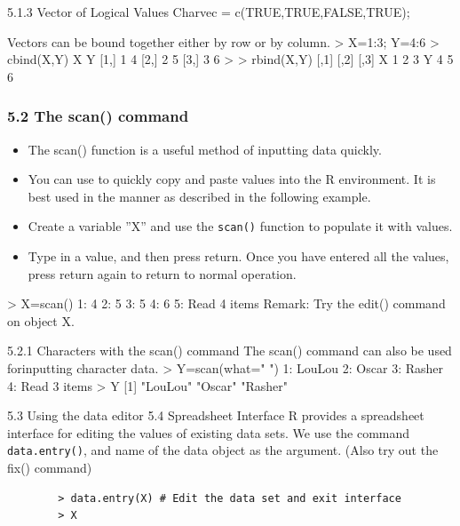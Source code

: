 \documentclass{beamer}
\begin{document}
\begin{frame}
	5.1.3 Vector of Logical Values
	Charvec = c(TRUE,TRUE,FALSE,TRUE);
	
	Vectors can be bound together either by row or by column.
	> X=1:3; Y=4:6
	> cbind(X,Y)
	X Y
	[1,] 1 4
	[2,] 2 5
	[3,] 3 6
	>
	> rbind(X,Y)
	[,1] [,2] [,3]
	X 1 2 3
	Y 4 5 6
\end{frame}
\begin{frame}
\frametitle{5.2 The scan() command}
\begin{itemize}
\item	The scan() function is a useful method of inputting data quickly. 
\item You can use to quickly copy
	and paste values into the R environment. It is best used in the manner as described in the
	following example. 
\item Create a variable ”X” and use the \texttt{scan()} function to populate it with
	values. 
\item Type in a value, and then press return. Once you have entered all the values, press
	return again to return to normal operation.
\end{itemize}
\end{frame}
\begin{frame}[fragile]
	> X=scan()
	1: 4
	2: 5
	3: 5
	4: 6
	5:
	Read 4 items
	Remark: Try the edit() command on object X.
\end{frame}
\begin{frame}[fragile]
	5.2.1 Characters with the scan() command
	The scan() command can also be used forinputting character data.
	> Y=scan(what=" ")
	1: LouLou
	2: Oscar
	3: Rasher
	4:
	Read 3 items
	> Y
	[1] "LouLou" "Oscar" "Rasher"
\end{frame}
\begin{frame}[fragile]
	5.3 Using the data editor
	5.4 Spreadsheet Interface
	R provides a spreadsheet interface for editing the values of existing data sets. We use the
	command \texttt{data.entry()}, and name of the data object as the argument. (Also try out the
	fix() command)
	\begin{framed}
	\begin{verbatim}
		> data.entry(X) # Edit the data set and exit interface
		> X
	\end{verbatim}
	\end{framed}

\end{frame}
\end{document}
